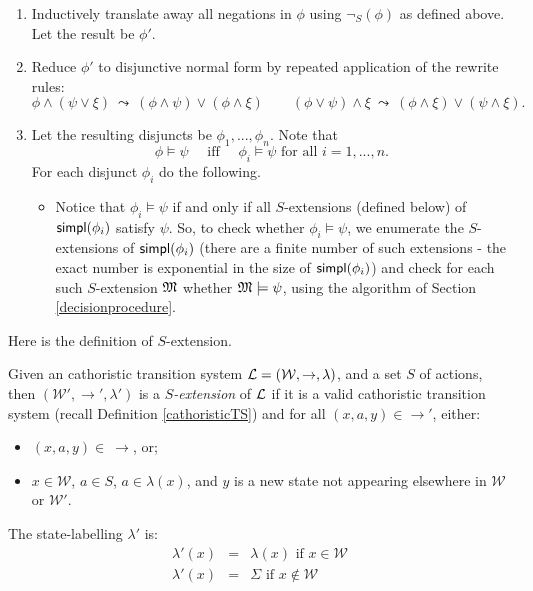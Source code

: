 \begin{enumerate}

\item Inductively translate away all negations in $\phi$ using
  $\neg_S(\phi)$ as defined above.  Let the result be $\phi'$.

\item Reduce $\phi'$ to disjunctive normal form by repeated
  application of the rewrite rules:
  \[
    \phi \land (\psi \lor \xi)  \ \leadsto \ (\phi \land \psi) \lor (\phi \land \xi)  
       \qquad
    (\phi \lor \psi) \land \xi  \ \leadsto \ (\phi \land \xi) \lor (\psi \land \xi). 
  \]

\item Let the resulting disjuncts be $\phi_1, ..., \phi_n$. 
Note that
\[
\phi \models \psi \quad\text{ iff }\quad \phi_i \models \psi \text{ for all } i = 1, ..., n.
\]
For each disjunct $\phi_i$ do the following.
\begin{itemize}

\item Notice that $\phi_i \models \psi$ if and only if all
  $S$-extensions (defined below) of $\mathsf{simpl}(\phi_i)$ satisfy $\psi$.
  So, to check whether $\phi_i \models \psi$, we enumerate the
  $S$-extensions of $\mathsf{simpl}(\phi_i)$ (there are a finite number of
  such extensions - the exact number is exponential in the size of
  $\mathsf{simpl}(\phi_i)$) and check for each such $S$-extension $\frak{M}$
  whether $\frak{M}\models \psi$, using the algorithm of Section
  \ref{decisionprocedure}.

\end{itemize}
\end{enumerate}

\NI  Here is the definition of $S$-extension.

\begin{definition}
Given an cathoristic transition system $\mathcal{L} =
(\mathcal{W},\rightarrow,\lambda)$, and a set $S$ of actions, then
$(\mathcal{W'},\rightarrow',\lambda')$ is a \emph{$S$-extension} of
$\mathcal{L}$ if it is a valid cathoristic transition system (recall
Definition \ref{cathoristicTS}) and for all $(x,a,y) \in
\rightarrow'$, either:
\begin{itemize} 

\item $(x, a, y) \in\ \rightarrow$,  or;

\item $x \in \mathcal{W}$, $a \in S$, $a \in \lambda(x)$, and $y$ is a new state not
  appearing elsewhere in $\mathcal{W}$ or $\mathcal{W'}$.

\end{itemize}
\end{definition}
The state-labelling $\lambda'$ is:
\begin{eqnarray*}
\lambda'(x) & = & \lambda(x) \text{ if } x \in \mathcal{W} \\
\lambda'(x) & = & \Sigma \text{ if } x \notin \mathcal{W} \\
\end{eqnarray*}

